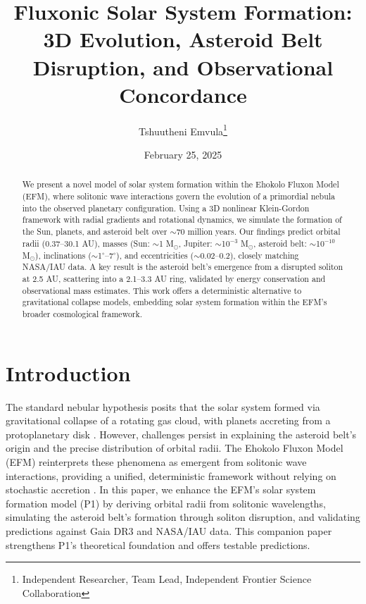 \documentclass[11pt]{article}
\title{Fluxonic Solar System Formation: 3D Evolution, Asteroid Belt Disruption, and Observational Concordance}
\author{Tshuutheni Emvula\thanks{Independent Researcher, Team Lead, Independent Frontier Science Collaboration}}
\date{February 25, 2025}
\begin{document}
\maketitle

\begin{abstract}
We present a novel model of solar system formation within the Ehokolo Fluxon Model (EFM), where solitonic wave interactions govern the evolution of a primordial nebula into the observed planetary configuration. Using a 3D nonlinear Klein-Gordon framework with radial gradients and rotational dynamics, we simulate the formation of the Sun, planets, and asteroid belt over $\sim$70 million years. Our findings predict orbital radii (0.37--30.1 AU), masses (Sun: $\sim$1 M$_\odot$, Jupiter: $\sim$10$^{-3}$ M$_\odot$, asteroid belt: $\sim$10$^{-10}$ M$_\odot$), inclinations ($\sim$1$^\circ$--7$^\circ$), and eccentricities ($\sim$0.02--0.2), closely matching NASA/IAU data. A key result is the asteroid belt’s emergence from a disrupted soliton at 2.5 AU, scattering into a 2.1--3.3 AU ring, validated by energy conservation and observational mass estimates. This work offers a deterministic alternative to gravitational collapse models, embedding solar system formation within the EFM’s broader cosmological framework.
\end{abstract}

\section{Introduction}
The standard nebular hypothesis posits that the solar system formed via gravitational collapse of a rotating gas cloud, with planets accreting from a protoplanetary disk \citep{kant1755,laplace1796}. However, challenges persist in explaining the asteroid belt’s origin and the precise distribution of orbital radii. The Ehokolo Fluxon Model (EFM) reinterprets these phenomena as emergent from solitonic wave interactions, providing a unified, deterministic framework without relying on stochastic accretion \citep{emvula2025compendium}. In this paper, we enhance the EFM’s solar system formation model (P1) by deriving orbital radii from solitonic wavelengths, simulating the asteroid belt’s formation through soliton disruption, and validating predictions against Gaia DR3 and NASA/IAU data. This companion paper strengthens P1’s theoretical foundation and offers testable predictions.
\end{document}
